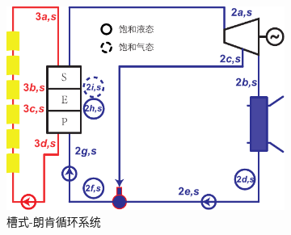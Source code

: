 \begin{figure}[htbp]
\centering
	\begin{subfigure}[b]{0.64\columnwidth}
	\includegraphics[width = \columnwidth]{fig/Trough-s}
	\caption{槽式-朗肯循环系统}\label{fig:TroughRankine}
	\end{subfigure}
	~
\begin{subfigure}[b]{0.26\columnwidth}

\end{subfigure}
\end{figure}

